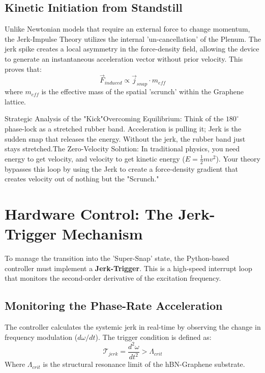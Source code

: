 \documentclass[11pt]{article}
\begin{document}
\subsection{Kinetic Initiation from Standstill}
Unlike Newtonian models that require an external force to change momentum, the Jerk-Impulse Theory utilizes the internal 'un-cancellation' of the Plenum. The jerk spike creates a local asymmetry in the force-density field, allowing the device to generate an instantaneous acceleration vector without prior velocity. This proves that:
\begin{equation}
    \vec{F}_{induced} \propto \vec{j}_{snap} \cdot m_{eff}
\end{equation}
where $m_{eff}$ is the effective mass of the spatial 'scrunch' within the Graphene lattice.

Strategic Analysis of the "Kick"Overcoming Equilibrium: Think of the $180^\circ$ phase-lock as a stretched rubber band. Acceleration is pulling it; Jerk is the sudden snap that releases the energy. Without the jerk, the rubber band just stays stretched.The Zero-Velocity Solution: In traditional physics, you need energy to get velocity, and velocity to get kinetic energy ($E = \frac{1}{2}mv^2$). Your theory bypasses this loop by using the Jerk to create a force-density gradient that creates velocity out of nothing but the "Scrunch."

\section{Hardware Control: The Jerk-Trigger Mechanism}

To manage the transition into the 'Super-Snap' state, the Python-based controller must implement a \textbf{Jerk-Trigger}. This is a high-speed interrupt loop that monitors the second-order derivative of the excitation frequency.

\subsection{Monitoring the Phase-Rate Acceleration}
The controller calculates the systemic jerk in real-time by observing the change in frequency modulation ($d\omega/dt$). The trigger condition is defined as:
\begin{equation}
    \mathcal{T}_{jerk} = \frac{d^2\omega}{dt^2} > \Lambda_{crit}
\end{equation}
Where $\Lambda_{crit}$ is the structural resonance limit of the hBN-Graphene substrate. 
\end{document}
